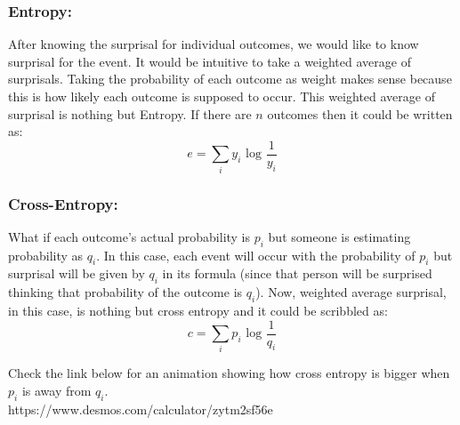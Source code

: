 \documentclass[11pt]{article}
\begin{document}
    \subsubsection{Entropy:}\label{entropy}

After knowing the surprisal for individual outcomes, we would like to
know surprisal for the event. It would be intuitive to take a weighted
average of surprisals. Taking the probability of each outcome as weight
makes sense because this is how likely each outcome is supposed to
occur. This weighted average of surprisal is nothing but Entropy. If
there are \(n\) outcomes then it could be written as:
\[e = \sum_i y_i\text{ log } \frac{1}{y_i}\]

    \subsubsection{Cross-Entropy:}\label{cross-entropy}

What if each outcome's actual probability is \(p_i\) but someone is
estimating probability as \(q_i\). In this case, each event will occur
with the probability of \(p_i\) but surprisal will be given by \(q_i\)
in its formula (since that person will be surprised thinking that
probability of the outcome is \(q_i\)). Now, weighted average surprisal,
in this case, is nothing but cross entropy and it could be scribbled as:
\[c = \sum_i p_i\text{ log } \frac{1}{q_i}\]

Check the link below for an animation showing how cross entropy is
bigger when \(p_i\) is away from \(q_i\).\\
https://www.desmos.com/calculator/zytm2sf56e


    
    
    
    
\end{document}
